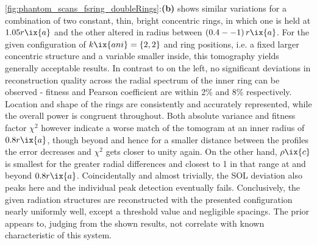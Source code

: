                 \autoref{fig:phantom_scans_fsring_doubleRings}:\textbf{(b)} shows similar variations for a combination of two constant, thin, bright concentric rings, in which one is held at $1.05r\ix{a}$ and the other altered in radius between $\left(0.4--1\right)r\ix{a}$. For the given configuration of $k\ix{ani}=\left\{2, 2\right\}$ and ring positions, i.e. a fixed larger concentric structure and a variable smaller inside, this tomography yields generally acceptable results. In contrast to on the left, no significant deviations in reconstruction quality across the radial spectrum of the inner ring can be observed - fitness and Pearson coefficient are within 2\% and 8\% respectively. Location and shape of the rings are consistently and accurately represented, while the overall power is congruent throughout. Both absolute variance and fitness factor $\chi^{2}$ however indicate a worse match of the tomogram at an inner radius of $0.8r\ix{a}$, though beyond and hence for a smaller distance between the profiles the error decreases and $\chi^{2}$ gets closer to unity again. On the other hand, $\rho\ix{c}$ is smallest for the greater radial differences and closest to \SI{1}{\arbitraryunit} in that range at and beyond $0.8r\ix{a}$. Coincidentally and almost trivially, the SOL deviation also peaks here and the individual peak detection eventually fails. Conclusively, the given radiation structures are reconstructed with the presented configuration nearly uniformly well, except a threshold value and negligible spacings. The prior appears to, judging from the shown results, not correlate with known characteristic of this system.%
%
